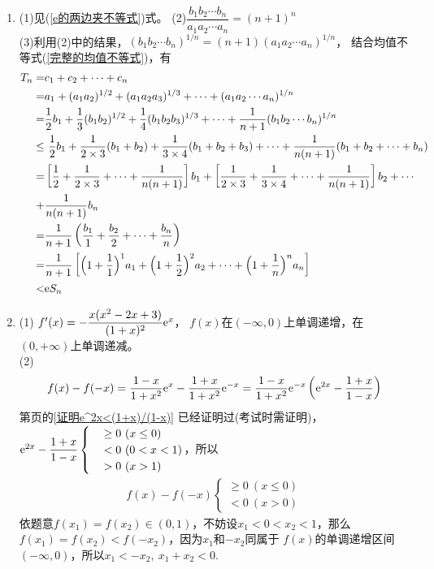 \begin{enumerate}[label={\textbf{\arabic*.}},leftmargin=
    \inteval{\myenumleftmargin}pt]
\item 
(1)见(\ref{e的两边夹不等式})式。 \quad (2)$ \dfrac{b_1b_2\cdots b_n}{a_1a_2\cdots a_n}=(n+1)^n $  \\
(3)利用(2)中的结果，$ (b_1b_2\cdots b_n)^{1/n}=(n+1)(a_1a_2\cdots a_n)^{1/n} $，
结合均值不等式(\ref{完整的均值不等式})，有
\begin{align*}
    T_n=&c_1+c_2+\cdots +c_n \\
    =&a_1+(a_1a_2)^{1/2}+(a_1a_2a_3)^{1/3}+\cdots + (a_1a_2\cdots a_n)^{1/n}\\
    =&\dfrac{1}{2}b_1+\dfrac{1}{3}(b_1b_2)^{1/2}+\dfrac{1}{4}(b_1b_2b_3)^{1/3}+
    \cdots+\dfrac{1}{n+1}(b_1b_2\cdots b_n)^{1/n} \\
    \leq &\ \dfrac{1}{2}b_1+\dfrac{1}{2\times 3}(b_1+b_2)+\dfrac{1}{3\times 4}(b_1+
    b_2+b_3)+\cdots +\dfrac{1}{n(n+1)}(b_1+b_2+\cdots +b_n) \\
    =&\left[\dfrac{1}{2}+\dfrac{1}{2\times 3}+\cdots+\dfrac{1}{n(n+1)}\right]b_1+
    \left[\dfrac{1}{2\times 3}+\dfrac{1}{3\times 4}+\cdots+\dfrac{1}{n(n+1)}\right]b_2+
    \cdots\\
    +&\dfrac{1}{n(n+1)}b_n \\
    =&\dfrac{1}{n+1}\left(\dfrac{b_1}{1}+\dfrac{b_2}{2}+\cdots+\dfrac{b_n}{n}\right) \\
    =&\dfrac{1}{n+1}\left[\Big(1+\dfrac{1}{1}\Big)^1 a_1+\Big(1+\dfrac{1}{2}\Big)^2 a_2+\cdots+\Big(1+\dfrac{1}{n}\Big)^n a_n \right] \\
    <& \mathrm{e} S_n
\end{align*}

\item (1) $ f'(x)=-\dfrac{x(x^2-2x+3)}{(1+x)^2}\mathrm{e}^x $，
$ f(x) $在$ (-\infty,0) $上单调递增，在$ (0,+\infty) $上单调递减。\\
(2) 
\begin{align*}
    f(x)-f(-x)=\dfrac{1-x}{1+x^2}\mathrm{e}^x-\dfrac{1+x}{1+x^2}\mathrm{e}^{-x}=
    \dfrac{1-x}{1+x^2}\mathrm{e}^{-x}\left(\mathrm{e}^{2x}-\dfrac{1+x}{1-x}\right)
\end{align*}
第\pageref{证明e^2x<(1+x)/(1-x)}页的\ref{证明e^2x<(1+x)/(1-x)}
已经证明过(考试时需证明)，$ \mathrm{e}^{2x}-\dfrac{1+x}{1-x}
\begin{cases}
    & \geq 0\ (x\leq 0) \\
    & < 0\ (0<x<1) \\
    & > 0\ (x>1)
\end{cases}$，所以
\begin{gather*}
    f(x)-f(-x) \begin{cases}
        \geq 0\ (x\leq 0) \\
        <0 \ (x>0) 
    \end{cases}
\end{gather*}
依题意$ f(x_1)=f(x_2)\in (0,1) $，不妨设$ x_1<0<x_2<1 $，那么
$ f(x_1)=f(x_2)<f(-x_2) $，因为$ x_1 $和$ -x_2 $同属于
$ f(x) $的单调递增区间$ (-\infty,0) $，所以$ x_1<-x_2,\ x_1+x_2<0 $.


\end{enumerate}
